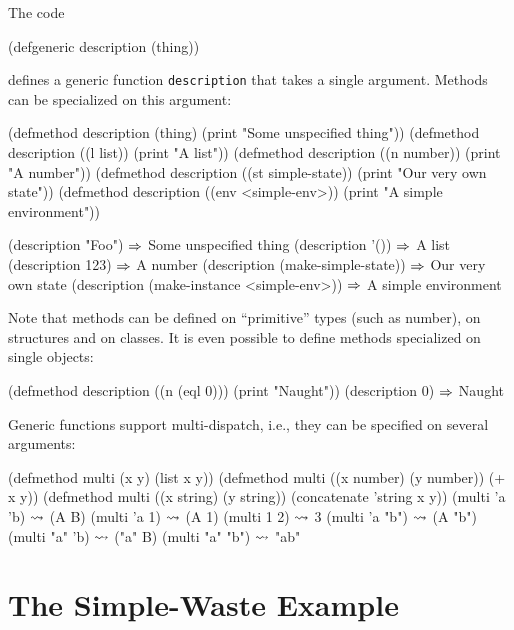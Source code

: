 \documentclass[a4paper]{amsart}
\begin{document}
The code
\begin{Code}
  (defgeneric description (thing))
\end{Code}
defines a generic function \texttt{description} that takes a single
argument.  Methods can be specialized on this argument:
\begin{Code}
  (defmethod description (thing)
    (print "Some unspecified thing"))
  (defmethod description ((l list))
    (print "A list"))
  (defmethod description ((n number))
    (print "A number"))
  (defmethod description ((st simple-state))
    (print "Our very own state"))
  (defmethod description ((env <simple-env>))
    (print "A simple environment"))

  (description "Foo")                        $\Rightarrow$ Some unspecified thing
  (description '())                          $\Rightarrow$ A list
  (description 123)                          $\Rightarrow$ A number
  (description (make-simple-state))          $\Rightarrow$ Our very own state
  (description (make-instance <simple-env>)) $\Rightarrow$ A simple environment
\end{Code}
Note that methods can be defined on ``primitive'' types (such as
number), on structures and on classes.  It is even possible to define
methods specialized on single objects:
\begin{Code}
  (defmethod description ((n (eql 0)))
    (print "Naught"))
  (description 0)                            $\Rightarrow$ Naught
\end{Code}

Generic functions support multi-dispatch, i.e., they can be specified
on several arguments:
\begin{Code}
  (defmethod multi (x y)
    (list x y))
  (defmethod multi ((x number) (y number))
    (+ x y))
  (defmethod multi ((x string) (y string))
    (concatenate 'string x y))
  (multi  'a  'b)                               $\rightsquigarrow$ (A B)
  (multi 'a   1)                                $\rightsquigarrow$ (A 1)
  (multi  1   2)                                $\rightsquigarrow$ 3
  (multi 'a  "b")                               $\rightsquigarrow$ (A "b")
  (multi "a" 'b)                                $\rightsquigarrow$ ("a" B)
  (multi "a" "b")                               $\rightsquigarrow$ "ab"
\end{Code}

\section{The Simple-Waste Example}
\label{sec:simple-waste}
\end{document}
